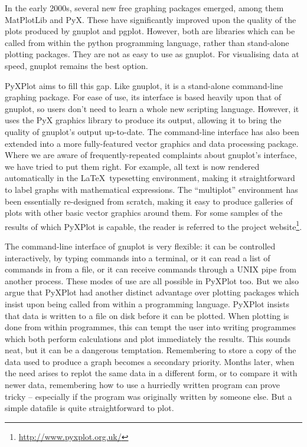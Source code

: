 In the early 2000s, several new free graphing packages emerged, among them {\sc
MatPlotLib} and {\sc PyX}.  These have significantly improved upon the quality
of the plots produced by gnuplot and pgplot. However, both are libraries which
can be called from within the python programming language, rather than
stand-alone plotting packages. They are not as easy to use as gnuplot.  For
visualising data at speed, gnuplot remains the best option.

{\sc PyXPlot} aims to fill this gap. Like gnuplot, it is a stand-alone
command-line graphing package. For ease of use, its interface is based heavily
upon that of gnuplot, so users don't need to learn a whole new scripting
language. However, it uses the PyX graphics library to produce its output,
allowing it to bring the quality of gnuplot's output up-to-date.  The
command-line interface has also been extended into a more fully-featured vector
graphics and data processing package.  Where we are aware of
frequently-repeated complaints about gnuplot's interface, we have tried to put
them right.  For example, all text is now rendered automatically in the \LaTeX\
typesetting environment, making it straightforward to label graphs with
mathematical expressions. The ``multiplot'' environment has been essentially
re-designed from scratch, making it easy to produce galleries of plots with
other basic vector graphics around them.  For some samples of the results of
which PyXPlot is capable, the reader is referred to the project
website\footnote{\url{http://www.pyxplot.org.uk/}}.

The command-line interface of gnuplot is very flexible: it can be controlled
interactively, by typing commands into a terminal, or it can read a list of
commands in from a file, or it can receive commands through a UNIX pipe from
another process. These modes of use are all possible in PyXPlot too.  But we
also argue that PyXPlot had another distinct advantage over plotting packages
which insist upon being called from within a programming language. PyXPlot
insists that data is written to a file on disk before it can be plotted. When
plotting is done from within programmes, this can tempt the user into writing
programmes which both perform calculations and plot immediately the results.
This sounds neat, but it can be a dangerous temptation. Remembering to store a
copy of the data used to produce a graph becomes a secondary priority.  Months
later, when the need arises to replot the same data in a different form, or to
compare it with newer data, remembering how to use a hurriedly written program
can prove tricky -- especially if the program was originally written by someone
else. But a simple datafile is quite straightforward to plot.

